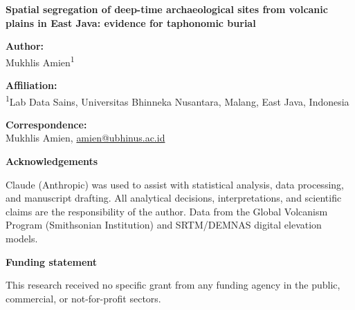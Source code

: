 \documentclass[12pt]{article}
\begin{document}
{\large\bfseries Spatial segregation of deep-time archaeological sites from volcanic plains in East Java: evidence for taphonomic burial}

\vspace{12pt}

\textbf{Author:}\\
Mukhlis Amien\textsuperscript{1}

\vspace{6pt}

\textbf{Affiliation:}\\
\textsuperscript{1}Lab Data Sains, Universitas Bhinneka Nusantara, Malang, East Java, Indonesia

\vspace{6pt}

\textbf{Correspondence:}\\
Mukhlis Amien, \href{mailto:amien@ubhinus.ac.id}{amien@ubhinus.ac.id}

\vspace{12pt}

\textbf{Acknowledgements}

Claude (Anthropic) was used to assist with statistical analysis, data processing, and manuscript drafting.
All analytical decisions, interpretations, and scientific claims are the responsibility of the author.
Data from the Global Volcanism Program (Smithsonian Institution) and SRTM/DEMNAS digital elevation models.

\vspace{12pt}

\textbf{Funding statement}

This research received no specific grant from any funding agency in the public, commercial, or not-for-profit sectors.
\end{document}
